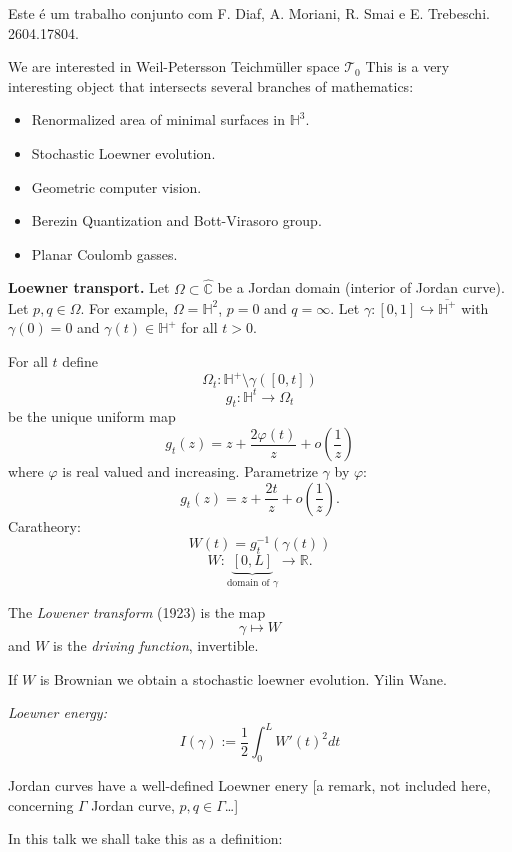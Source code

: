 Este é um trabalho conjunto com F. Diaf,
A. Moriani, R. Smai e E. Trebeschi.
2604.17804.

\medskip\noindent
We are interested in Weil-Petersson
Teichmüller space $\mathcal{T}_0$
This is a very interesting object
that intersects several branches of 
mathematics:
\begin{itemize}
\item Renormalized area of minimal surfaces
in $\mathbb{H}^3$.
\item Stochastic Loewner evolution.
\item Geometric computer vision.
\item Berezin Quantization and Bott-Virasoro
group.
\item Planar Coulomb gasses.
\end{itemize}

\medskip\noindent
{\bf Loewner transport.}
Let  $\Omega \subset \hat{\mathbb{C}}$
be a Jordan domain (interior of Jordan
curve).
Let $p,q \in \Omega$.
For example, $\Omega=\mathbb{H}^2$,
$p=0$ and $q=\infty$.
Let $\gamma:[0,1]\hookrightarrow
\overline{\mathbb{H}^+}$
with $\gamma(0)=0$ and $\gamma(t) \in
\mathbb{H}^+$ for all $t>0$.

For all $t$ define
$$
\Omega_t:\mathbb{H}^+\setminus
\gamma([0,t])
$$
$$
g_t:\mathbb{H}^t \to \Omega_t
$$
be the unique uniform map
$$
g_t(z)
=z + \frac{2\varphi(t)}{z}
+ o \left(\frac{1}{z}\right)
$$
where $\varphi$ is real valued and
increasing. Parametrize $\gamma$
by $\varphi$:
$$
g_t(z)=z+ \frac{2t}{z}
+o \left(\frac{1}{z}\right).
$$
Caratheory:
$$
W(t)=g^{-1}_t(\gamma(t))
$$
$$
W:\underbrace{[0,L]}_{\text{domain of }
\gamma} \to \mathbb{R}.
$$

The {\it Lowener transform} (1923)
is the map
$$
\gamma \mapsto W
$$
and $W$ is the {\it driving function},
invertible.

\begin{remark}
\label{remark-brownian-loewner}
If $W$ is Brownian we obtain a 
stochastic loewner evolution.
Yilin Wane.
\end{remark}

\medskip\noindent
{\it Loewner energy:}
$$
I(\gamma)
:= \frac{1}{2}
\int_0^L W'(t)^2 dt
$$
\begin{remark}
\label{remark-loewner-energy-independent}
Jordan curves have a well-defined
Loewner enery
[a remark, not included here, concerning
$\Gamma$ Jordan curve, $p,q \in \Gamma$…]
\end{remark}

\noindent
In this talk we shall take this
as a definition:

